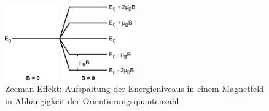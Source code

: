 \begin{figure}[h!]
	\centering
	\includegraphics[width=0.5\textwidth]{Anleitung_Abb3.pdf}
	\caption[Zeeman-Effekt]{Zeeman-Effekt: Aufspaltung der Energieniveaus in einem Magnetfeld in Abhängigkeit der Orientierungsquantenzahl \cite{V28}}
	\label{fig:energieniveaus}
\end{figure}
